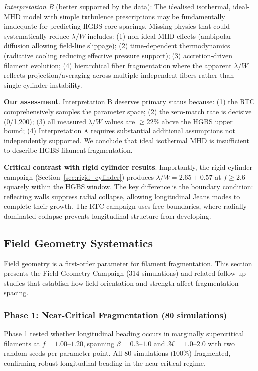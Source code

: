\documentclass[twocolumn]{mnras}
\begin{document}
\textit{Interpretation B} (better supported by the data): The idealised isothermal, ideal-MHD model with simple turbulence prescriptions may be fundamentally inadequate for predicting HGBS core spacings. Missing physics that could systematically reduce $\lambda/W$ includes: (1) non-ideal MHD effects (ambipolar diffusion allowing field-line slippage); (2) time-dependent thermodynamics (radiative cooling reducing effective pressure support); (3) accretion-driven filament evolution; (4) hierarchical fiber fragmentation where the apparent $\lambda/W$ reflects projection/averaging across multiple independent fibers rather than single-cylinder instability.

\textbf{Our assessment}. Interpretation B deserves primary status because: (1) the RTC comprehensively samples the parameter space; (2) the zero-match rate is decisive (0/1,200); (3) all measured $\lambda/W$ values are $\geq$22\% above the HGBS upper bound; (4) Interpretation A requires substantial additional assumptions not independently supported. We conclude that ideal isothermal MHD is insufficient to describe HGBS filament fragmentation.

\textbf{Critical contrast with rigid cylinder results}. Importantly, the rigid cylinder campaign (Section~\ref{sec:rigid_cylinder}) produces $\lambda/W = 2.65 \pm 0.57$ at $f \geq 2.6$—squarely within the HGBS window. The key difference is the boundary condition: reflecting walls suppress radial collapse, allowing longitudinal Jeans modes to complete their growth. The RTC campaign uses free boundaries, where radially-dominated collapse prevents longitudinal structure from developing.

\subsection{Field Geometry Systematics}

Field geometry is a first-order parameter for filament fragmentation. This section presents the Field Geometry Campaign (314 simulations) and related follow-up studies that establish how field orientation and strength affect fragmentation spacing.

\subsubsection{Phase 1: Near-Critical Fragmentation (80 simulations)}

Phase 1 tested whether longitudinal beading occurs in marginally supercritical filaments at $f = 1.00$--$1.20$, spanning $\beta = 0.3$--$1.0$ and $\mathcal{M} = 1.0$--$2.0$ with two random seeds per parameter point. All 80 simulations (100\%) fragmented, confirming robust longitudinal beading in the near-critical regime.
\end{document}

